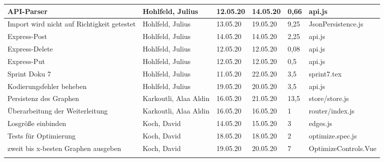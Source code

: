 \begin{longtable}{|p{4cm}|p{2cm}|p{1.2cm}|p{1.2cm}|p{0.7cm}|p{3.8cm}|}
  API-Parser                                                            & Hohlfeld, Julius      & 12.05.20 & 14.05.20 & 0,66  & api.js                                                      \\ \hline         
  Import wird nicht auf Richtigkeit getestet                            & Hohlfeld, Julius      & 13.05.20 & 19.05.20 & 9,25  & JsonPersistence.js                                          \\ \hline
  Express-Post                                                          & Hohlfeld, Julius      & 14.05.20 & 14.05.20 & 2,25  & api.js                                                      \\ \hline
  Express-Delete                                                        & Hohlfeld, Julius      & 12.05.20 & 12.05.20 & 0,08  & api.js                                                      \\ \hline
  Express-Put                                                           & Hohlfeld, Julius      & 12.05.20 & 12.05.20 & 0,5   & api.js                                                      \\ \hline
  Sprint Doku 7                                                         & Hohlfeld, Julius      & 11.05.20 & 22.05.20 & 3,5   & sprint7.tex                                                 \\ \hline
  Kodierungsfehler beheben                                              & Hohlfeld, Julius      & 19.05.20 & 20.05.20 & 3,5   & api.js                                                      \\ \hline
  
  Persistenz des Graphen                                                & Karkoutli, Alaa Aldin & 16.05.20 & 21.05.20 & 13,5  & store/store.js                                              \\ \hline
  Überarbeitung der Weiterleitung                                       & Karkoutli, Alaa Aldin & 16.05.20 & 16.05.20 & 1     & router/index.js                                             \\ \hline

  Losgröße einbinden                                                    & Koch, David           & 14.05.20 & 15.05.20 & 3     & edges.js                                                    \\ \hline
  Tests für Optimierung                                                 & Koch, David           & 18.05.20 & 18.05.20 & 2     & optimize.spec.js                                            \\ \hline
  zweit bis x-besten Graphen ausgeben                                   & Koch, David           & 19.05.20 & 20.05.20 & 7     & OptimizeControls.Vue                                        \\ \hline
  \\ \hline
\end{longtable}

